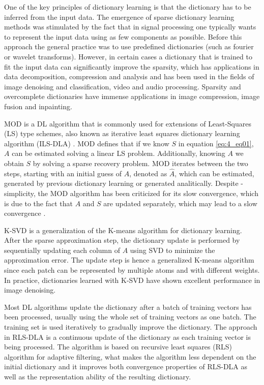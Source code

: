 One of the key principles of dictionary learning is that the dictionary has to be inferred from the input data. The emergence of sparse dictionary learning methods was stimulated by the fact that in signal processing one typically wants to represent the input data using as few components as possible. Before this approach the general practice was to use predefined dictionaries (such as fourier or wavelet transforms). However, in certain cases a dictionary that is trained to fit the input data can significantly improve the sparsity, which has applications in data decomposition, compression and analysis and has been used in the fields of image denoising and classification, video and audio processing. Sparsity and overcomplete dictionaries have immense applications in image compression, image fusion and inpainting.

MOD \cite{engan1999method} is a DL algorithm that is commonly used for extensions of Least-Squares (LS) type schemes, also known as iterative least squares dictionary learning algorithm (ILS-DLA) \cite{engan2007family}. MOD defines that if we know $S$ in equation \ref{eq:4_eq01}, $A$ can be estimated solving a linear LS problem. Additionally, knowing $A$ we obtain $S$ by solving a sparse recovery problem. MOD iterates between the two steps, starting with an initial guess of $A$, denoted as $\hat{A}$, which can be estimated, generated by previous dictionary learning or generated analitically. Despite - simplicity, the MOD algorithm has been criticized for its slow convergence, which is due to the fact that $A$ and $S$ are updated separately, which may lead to a slow convergence \cite{aharon2006rm}.

K-SVD \cite{aharon2006rm} is a generalization of the K-means algorithm for dictionary learning. After the sparse approximation step, the dictionary update is performed by sequentially updating each column of $A$ using SVD to minimize the approximation error. The update step is hence a generalized K-means algorithm since each patch can be represented by multiple atoms and with different weights. In practice, dictionaries learned with K-SVD
have shown excellent performance in image denoising. 

Most DL algorithms update the dictionary after a batch of training vectors has been processed, usually using the whole set of training vectors as one batch. The training set is used iteratively to gradually improve the dictionary. The approach in RLS-DLA \cite{skretting2010recursive} is a continuous update of the dictionary as each training vector is being processed. The algorithm is based on recursive least squares (RLS) algorithm for adaptive filtering, what makes the algorithm less dependent on the initial dictionary and it improves both convergence properties of RLS-DLA as well as the representation ability of the resulting dictionary. 

